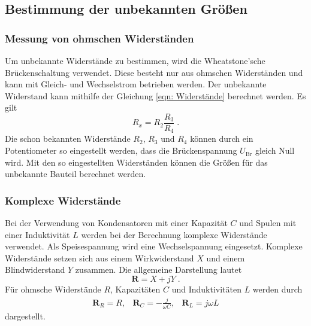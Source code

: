 \subsection{Bestimmung der unbekannten Größen}

    \subsubsection{Messung von ohmschen Widerständen} \label{sec:Wheatstone}

        Um unbekannte Widerstände zu bestimmen, wird die Wheatstone'sche Brückenschaltung verwendet.
        Diese besteht nur aus ohmschen Widerständen und kann mit Gleich- und Wechselstrom betrieben werden.
        Der unbekannte Widerstand kann mithilfe der Gleichung \eqref{eqn: Widerstände} berechnet werden.
        Es gilt
        \begin{equation}
            R_x = R_2 \frac{R_3}{R_4} \; . \label{eqn: Rx}
        \end{equation}
        Die schon bekannten Widerstände $R_2$, $R_3$ und $R_4$ können durch ein Potentiometer so eingestellt werden,
        dass die Brückenspannung $U_\text{Br}$ gleich Null wird.
        Mit den so eingestellten Widerständen können die Größen für das unbekannte Bauteil berechnet werden.

    \subsubsection{Komplexe Widerstände}

        Bei der Verwendung von Kondensatoren mit einer Kapazität $C$ und Spulen mit einer Induktivität $L$ werden bei der Berechnung
        komplexe Widerstände verwendet. Als Speisespannung wird eine Wechselspannung eingesetzt.
        Komplexe Widerstände setzen sich aus einem Wirkwiderstand $X$ und einem Blindwiderstand $Y$ zusammen.
        Die allgemeine Darstellung lautet
        \begin{equation}
            \symbf{R} = X + jY \; .
        \end{equation}
        Für ohmsche Widerstände $R$, Kapazitäten $C$ und Induktivitäten $L$ werden durch
        \begin{align}
            \symbf{R}_R = R, & \symbf{R}_C = - \frac{j}{\omega C}, & \symbf{R}_L = j \omega L
        \end{align}
        dargestellt.

